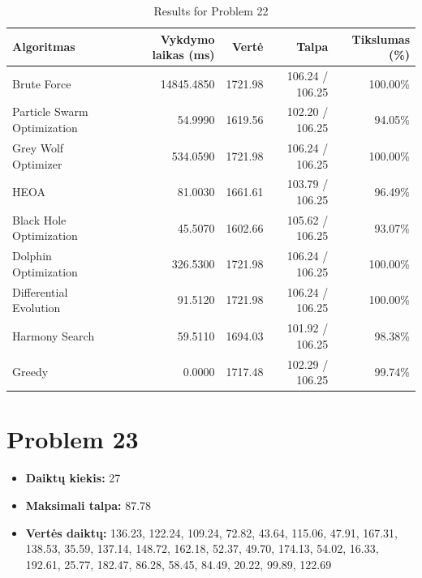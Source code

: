 \documentclass[a4paper,11pt]{article}
\begin{document}
\begin{table}[h!]
\centering
\begin{tabular}{lrrrr}
\toprule
\textbf{Algoritmas} & \textbf{Vykdymo laikas (ms)} & \textbf{Vertė} & \textbf{Talpa} & \textbf{Tikslumas (\%)} \\
\midrule
Brute Force & 14845.4850 & 1721.98 & 106.24 / 106.25 & 100.00\% \\
Particle Swarm Optimization & 54.9990 & 1619.56 & 102.20 / 106.25 & 94.05\% \\
Grey Wolf Optimizer & 534.0590 & 1721.98 & 106.24 / 106.25 & 100.00\% \\
HEOA & 81.0030 & 1661.61 & 103.79 / 106.25 & 96.49\% \\
Black Hole Optimization & 45.5070 & 1602.66 & 105.62 / 106.25 & 93.07\% \\
Dolphin Optimization & 326.5300 & 1721.98 & 106.24 / 106.25 & 100.00\% \\
Differential Evolution & 91.5120 & 1721.98 & 106.24 / 106.25 & 100.00\% \\
Harmony Search & 59.5110 & 1694.03 & 101.92 / 106.25 & 98.38\% \\
Greedy & 0.0000 & 1717.48 & 102.29 / 106.25 & 99.74\% \\
\bottomrule
\end{tabular}
\caption{Results for Problem 22}
\end{table}
\clearpage

\section*{Problem 23}
\begin{itemize}
    \item \textbf{Daiktų kiekis:} 27
    \item \textbf{Maksimali talpa:} 87.78
    \item \textbf{Vertės daiktų:} 136.23, 122.24, 109.24, 72.82, 43.64, 115.06, 47.91, 167.31, 138.53, 35.59, 137.14, 148.72, 162.18, 52.37, 49.70, 174.13, 54.02, 16.33, 192.61, 25.77, 182.47, 86.28, 58.45, 84.49, 20.22, 99.89, 122.69
\end{itemize}
\end{document}
